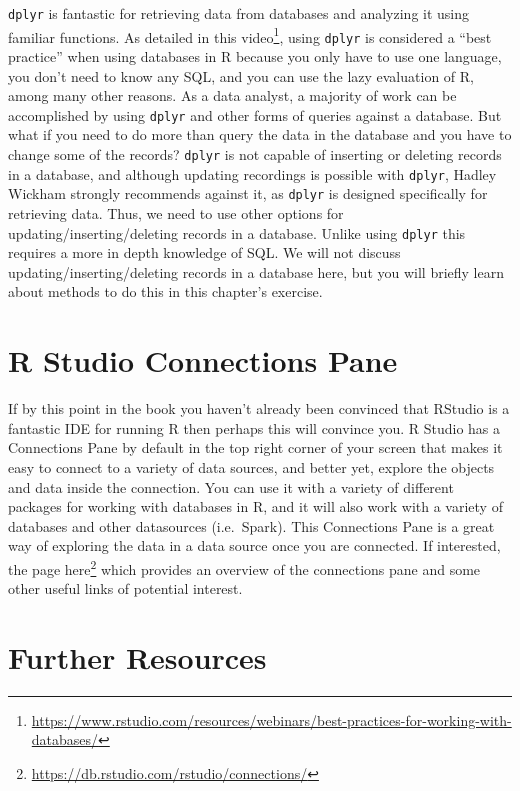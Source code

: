 \documentclass[
]{krantz}
\renewcommand{\href}[2]{#2\footnote{\url{#1}}}
\begin{document}
\texttt{dplyr} is fantastic for retrieving data from databases and analyzing it using familiar functions. As detailed in this \href{https://www.rstudio.com/resources/webinars/best-practices-for-working-with-databases/}{video}, using \texttt{dplyr} is considered a ``best practice'' when using databases in R because you only have to use one language, you don't need to know any SQL, and you can use the lazy evaluation of R, among many other reasons. As a data analyst, a majority of work can be accomplished by using \texttt{dplyr} and other forms of queries against a database. But what if you need to do more than query the data in the database and you have to change some of the records? \texttt{dplyr} is not capable of inserting or deleting records in a database, and although updating recordings is possible with \texttt{dplyr}, Hadley Wickham strongly recommends against it, as \texttt{dplyr} is designed specifically for retrieving data. Thus, we need to use other options for updating/inserting/deleting records in a database. Unlike using \texttt{dplyr} this requires a more in depth knowledge of SQL. We will not discuss updating/inserting/deleting records in a database here, but you will briefly learn about methods to do this in this chapter's exercise.

\hypertarget{r-studio-connections-pane}{%
\section{R Studio Connections Pane}\label{r-studio-connections-pane}}

If by this point in the book you haven't already been convinced that RStudio is a fantastic IDE for running R then perhaps this will convince you. R Studio has a Connections Pane by default in the top right corner of your screen that makes it easy to connect to a variety of data sources, and better yet, explore the objects and data inside the connection. You can use it with a variety of different packages for working with databases in R, and it will also work with a variety of databases and other datasources (i.e.~Spark). This Connections Pane is a great way of exploring the data in a data source once you are connected. If interested, the page \href{https://db.rstudio.com/rstudio/connections/}{here} which provides an overview of the connections pane and some other useful links of potential interest.

\hypertarget{further-resources}{%
\section{Further Resources}\label{further-resources}}
\end{document}
